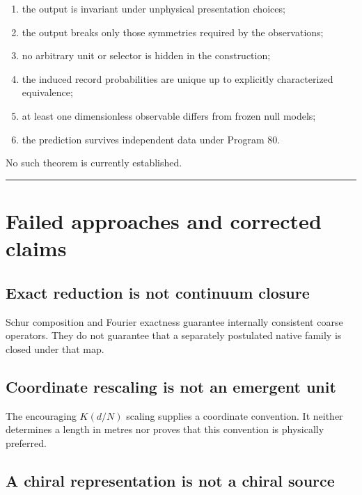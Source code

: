 \documentclass[11pt,a4paper,openany]{report}
\begin{document}
\begin{enumerate}
\item 
the output is invariant under unphysical presentation choices;

\item 
the output breaks only those symmetries required by the observations;

\item 
no arbitrary unit or selector is hidden in the construction;

\item 
the induced record probabilities are unique up to explicitly characterized equivalence;

\item 
at least one dimensionless observable differs from frozen null models;

\item 
the prediction survives independent data under Program 80.

\end{enumerate}

No such theorem is currently established.

\par\medskip\hrule\medskip

\chapter{Failed approaches and corrected claims}

\section{Exact reduction is not continuum closure}

Schur composition and Fourier exactness guarantee internally consistent coarse operators. They do not guarantee that a separately postulated native family is closed under that map.

\section{Coordinate rescaling is not an emergent unit}

The encouraging \(K(d/N)\) scaling supplies a coordinate convention. It neither determines a length in metres nor proves that this convention is physically preferred.

\section{A chiral representation is not a chiral source}
\end{document}
